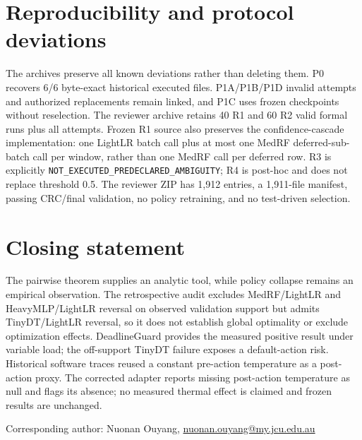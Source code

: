 \documentclass[11pt]{article}
\begin{document}
\section*{Reproducibility and protocol deviations}
The archives preserve all known deviations rather than deleting them. P0 recovers 6/6 byte-exact historical executed files. P1A/P1B/P1D invalid attempts and authorized replacements remain linked, and P1C uses frozen checkpoints without reselection. The reviewer archive retains 40 R1 and 60 R2 valid formal runs plus all attempts. Frozen R1 source also preserves the confidence-cascade implementation: one LightLR batch call plus at most one MedRF deferred-sub-batch call per window, rather than one MedRF call per deferred row. R3 is explicitly \texttt{NOT\_EXECUTED\_}\allowbreak\texttt{PREDECLARED\_AMBIGUITY}; R4 is post-hoc and does not replace threshold 0.5. The reviewer ZIP has 1{,}912 entries, a 1{,}911-file manifest, passing CRC/final validation, no policy retraining, and no test-driven selection.

\section*{Closing statement}
The pairwise theorem supplies an analytic tool, while policy collapse remains an empirical observation. The retrospective audit excludes MedRF/LightLR and HeavyMLP/LightLR reversal on observed validation support but admits TinyDT/LightLR reversal, so it does not establish global optimality or exclude optimization effects. DeadlineGuard provides the measured positive result under variable load; the off-support TinyDT failure exposes a default-action risk. Historical software traces reused a constant pre-action temperature as a post-action proxy. The corrected adapter reports missing post-action temperature as null and flags its absence; no measured thermal effect is claimed and frozen results are unchanged.

\vspace{6pt}
Corresponding author: Nuonan Ouyang, \href{mailto:nuonan.ouyang@my.jcu.edu.au}{nuonan.ouyang@my.jcu.edu.au}
\end{document}

